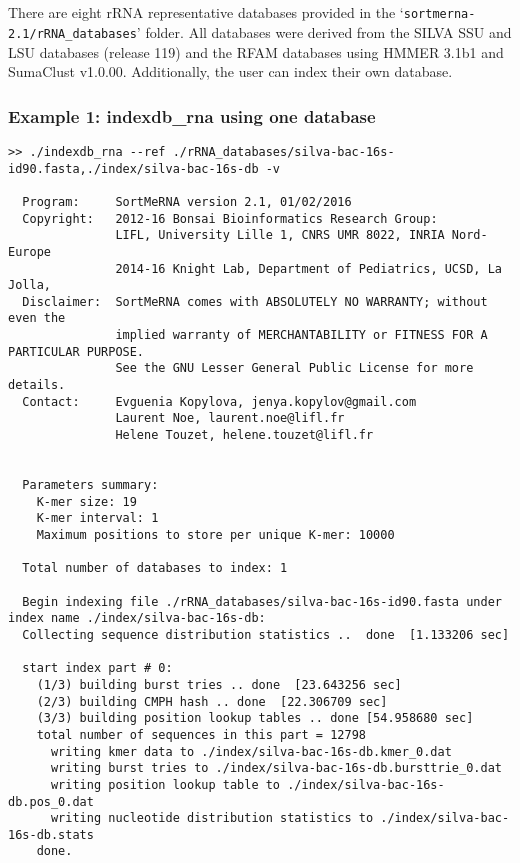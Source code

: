 \documentclass[10pt,a4paper]{article}
\begin{document}
~\\~\\
\noindent There are eight rRNA representative databases provided in the `\texttt{sortmerna- 2.1/rRNA\_databases}' folder. 
All databases were derived from the SILVA SSU and LSU databases (release 119) and the RFAM databases using HMMER 3.1b1 and SumaClust v1.0.00.
Additionally, the user can index their own database. \\

\subsubsection{Example 1: indexdb\_rna using one database}

\begin{Verbatim}[fontsize=\footnotesize]
>> ./indexdb_rna --ref ./rRNA_databases/silva-bac-16s-id90.fasta,./index/silva-bac-16s-db -v

  Program:     SortMeRNA version 2.1, 01/02/2016
  Copyright:   2012-16 Bonsai Bioinformatics Research Group:
               LIFL, University Lille 1, CNRS UMR 8022, INRIA Nord-Europe
               2014-16 Knight Lab, Department of Pediatrics, UCSD, La Jolla,
  Disclaimer:  SortMeRNA comes with ABSOLUTELY NO WARRANTY; without even the
               implied warranty of MERCHANTABILITY or FITNESS FOR A PARTICULAR PURPOSE.
               See the GNU Lesser General Public License for more details.
  Contact:     Evguenia Kopylova, jenya.kopylov@gmail.com 
               Laurent Noe, laurent.noe@lifl.fr
               Helene Touzet, helene.touzet@lifl.fr


  Parameters summary: 
    K-mer size: 19
    K-mer interval: 1
    Maximum positions to store per unique K-mer: 10000

  Total number of databases to index: 1

  Begin indexing file ./rRNA_databases/silva-bac-16s-id90.fasta under index name ./index/silva-bac-16s-db: 
  Collecting sequence distribution statistics ..  done  [1.133206 sec]

  start index part # 0: 
    (1/3) building burst tries .. done  [23.643256 sec]
    (2/3) building CMPH hash .. done  [22.306709 sec]
    (3/3) building position lookup tables .. done [54.958680 sec]
    total number of sequences in this part = 12798
      writing kmer data to ./index/silva-bac-16s-db.kmer_0.dat
      writing burst tries to ./index/silva-bac-16s-db.bursttrie_0.dat
      writing position lookup table to ./index/silva-bac-16s-db.pos_0.dat
      writing nucleotide distribution statistics to ./index/silva-bac-16s-db.stats
    done.
    
\end{Verbatim}
\end{document}
